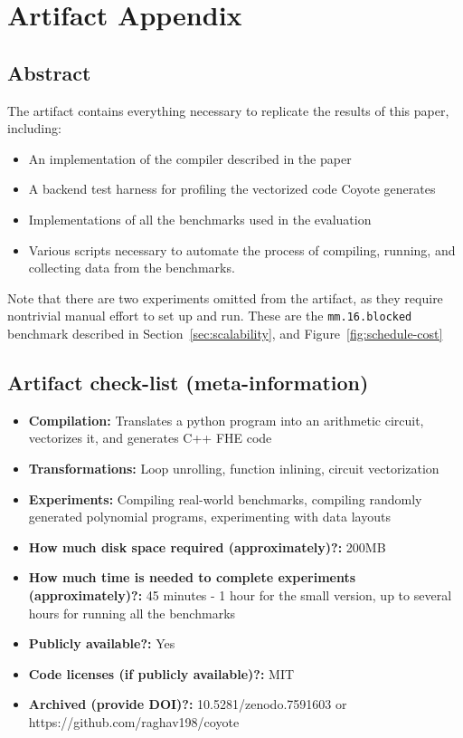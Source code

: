 \section{Artifact Appendix}

\subsection{Abstract}

The artifact contains everything necessary to replicate the results of this paper, including:
\begin{itemize}
    \item An implementation of the compiler described in the paper
    \item A backend test harness for profiling the vectorized code Coyote generates
    \item Implementations of all the benchmarks used in the evaluation
    \item Various scripts necessary to automate the process of compiling, running, and collecting data from the benchmarks.
\end{itemize}

Note that there are two experiments omitted from the artifact, as they require nontrivial manual effort to set up and run. These are the {\tt mm.16.blocked} benchmark described in Section~\ref{sec:scalability}, and Figure~\ref{fig:schedule-cost}

\subsection{Artifact check-list (meta-information)}

{\small
\begin{itemize}
  \item {\bf Compilation: } Translates a python program into an arithmetic circuit, vectorizes it, and generates C++ FHE code
  \item {\bf Transformations: } Loop unrolling, function inlining, circuit vectorization
  \item {\bf Experiments: } Compiling real-world benchmarks, compiling randomly generated polynomial programs, experimenting with data layouts
  \item {\bf How much disk space required (approximately)?: } 200MB
  \item {\bf How much time is needed to complete experiments (approximately)?: } 45 minutes - 1 hour for the small version, up to several hours for running all the benchmarks
  \item {\bf Publicly available?: } Yes
  \item {\bf Code licenses (if publicly available)?: } MIT
  \item {\bf Archived (provide DOI)?: } 10.5281/zenodo.7591603 or https://github.com/raghav198/coyote
  
\end{itemize}
}

